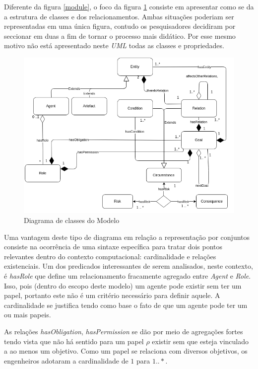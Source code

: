Diferente da figura \ref{module}, o foco da figura \ref{classdiagrama} consiste em apresentar como se da a estrutura de classes e dos relacionamentos. Ambas situações poderiam ser representadas em uma única figura, contudo os pesquisadores decidiram por seccionar em duas a fim de tornar o processo mais didático. Por esse mesmo motivo não está apresentado neste \textit{UML} todas as classes e propriedades.  

\begin{figure}[H]
  \centering
  \includegraphics[width=1\linewidth]{figure/Class.png} 
  \caption{Diagrama de classes do Modelo }
  \label{classdiagrama}
\end{figure}

Uma vantagem deste tipo de diagrama em relação a representação por conjuntos consiste na ocorrência de uma sintaxe específica para tratar dois pontos relevantes dentro do contexto computacional: cardinalidade e relações existenciais. Um dos predicados interessantes de serem analisados, neste contexto, é \textit{hasRole} que define um relacionamento fracamente agregado entre \textit{Agent} e \textit{Role}. Isso, pois (dentro do escopo deste modelo) um agente pode existir sem ter um papel, portanto este não é um critério necessário para definir aquele. A cardinalidade se justifica tendo como base o fato de que um agente pode ter um ou mais papeis. 

As relações \textit{hasObligation}, \textit{hasPermission} se dão por meio de agregações fortes tendo vista que não há sentido para um papel $\rho$ existir sem que esteja vinculado a ao menos um objetivo. Como um papel se relaciona com diversos objetivos, os engenheiros adotaram a cardinalidade de $1$ para $1 .. *$.

